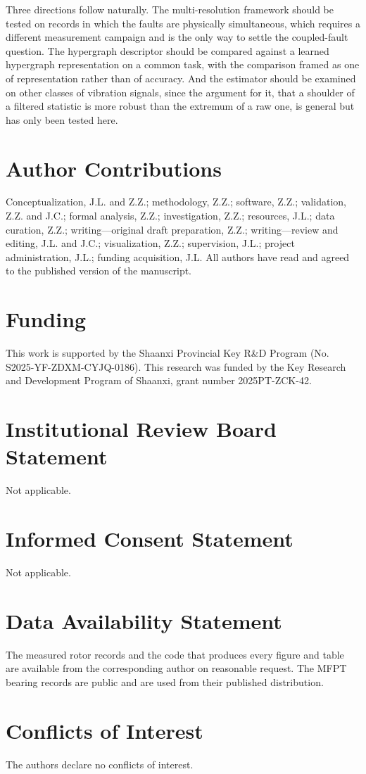 \documentclass[10pt,a4paper,twocolumn]{article}
\begin{document}
Three directions follow naturally.  The multi-resolution framework should be
tested on records in which the faults are physically simultaneous, which
requires a different measurement campaign and is the only way to settle the
coupled-fault question.  The hypergraph descriptor should be compared against
a learned hypergraph representation on a common task, with the comparison
framed as one of representation rather than of accuracy.  And the estimator
should be examined on other classes of vibration signals, since the argument
for it, that a shoulder of a filtered statistic is more robust than the
extremum of a raw one, is general but has only been tested here.

\section*{Author Contributions}
Conceptualization, J.L. and Z.Z.; methodology, Z.Z.; software, Z.Z.; validation, Z.Z. and J.C.; formal analysis, Z.Z.; investigation, Z.Z.; resources, J.L.; data curation, Z.Z.; writing---original draft preparation, Z.Z.; writing---review and editing, J.L. and J.C.; visualization, Z.Z.; supervision, J.L.; project administration, J.L.; funding acquisition, J.L. All authors have read and agreed to the published version of the manuscript.

\section*{Funding}
This work is supported by the Shaanxi Provincial Key R\&D Program (No. S2025-YF-ZDXM-CYJQ-0186). This research was funded by the Key Research and Development Program of Shaanxi, grant number 2025PT-ZCK-42.

\section*{Institutional Review Board Statement}
Not applicable.

\section*{Informed Consent Statement}
Not applicable.

\section*{Data Availability Statement}
The measured rotor records and the code that produces every figure and table are available from the corresponding author on reasonable request. The MFPT bearing records are public and are used from their published distribution.

\section*{Conflicts of Interest}
The authors declare no conflicts of interest.



\end{document}
